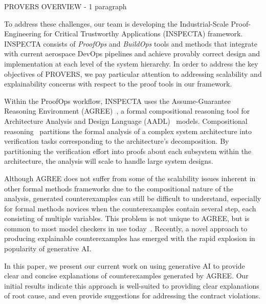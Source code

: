 PROVERS OVERVIEW - 1 paragraph

To address these challenges, our team is developing the Industrial-Scale Proof-Engineering for Critical Trustworthy Applications (INSPECTA) framework.  INSPECTA consists of \textit{ProofOps} and \textit{BuildOps} tools and methods that integrate with current aerospace DevOps pipelines and achieve provably correct design and implementation at each level of the system hierarchy.  In order to address the key objectives of PROVERS, we pay particular attention to addressing scalability and explainability concerns with respect to the proof tools in our framework.

Within the ProofOps workflow, INSPECTA uses the Assume-Guarantee Reasoning Environment (AGREE)~\cite{}, a formal compositional reasoning tool for Architecture Analysis and Design Language (AADL)~\cite{} models.
Compositional reasoning~\cite{} partitions the formal analysis of a complex system architecture into verification tasks corresponding to the architecture's decomposition.  By partitioning the verification effort into proofs about each subsystem within the architecture, the analysis will scale to handle large system designs.

Although AGREE does not suffer from some of the scalability issues inherent in other formal methods frameworks due to the compositional nature of the analysis, generated counterexamples can still be difficult to understand, especially for formal methods novices when the counterexamples contain several step, each consisting of multiple variables.  This problem is not unique to AGREE, but is common to most model checkers in use today~\cite{}.  Recently, a novel approach to producing explainable counterexamples has emerged with the rapid explosion in popularity of generative AI.

In this paper, we present our current work on using generative AI to provide clear and concise explanations of counterexamples generated by AGREE.  Our initial results indicate this approach is well-suited to providing clear explanations of root cause, and even provide suggestions for addressing the contract violations.